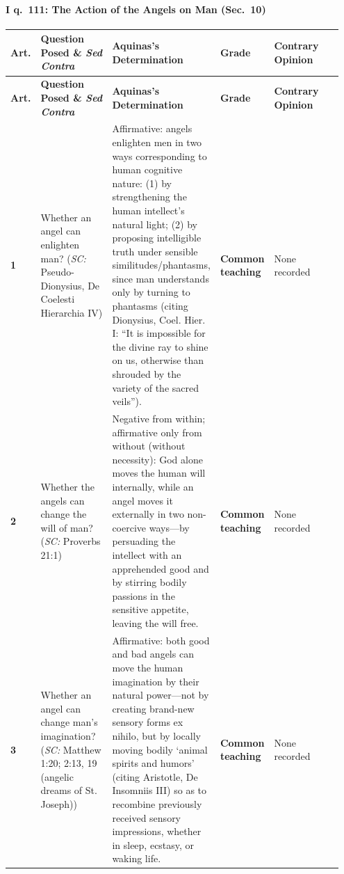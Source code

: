 \paragraph{I q.~111: The Action of the Angels on Man (Sec.~10)}
{\scriptsize
\setlength{\tabcolsep}{2.5pt}
\renewcommand{\arraystretch}{1.15}
\begin{longtable}{>{\raggedright\arraybackslash}p{0.05\linewidth}>{\raggedright\arraybackslash}p{0.23\linewidth}>{\raggedright\arraybackslash}p{0.31\linewidth}>{\raggedright\arraybackslash}p{0.12\linewidth}>{\raggedright\arraybackslash}p{0.24\linewidth}}
\toprule
\textbf{Art.} & \textbf{Question Posed \& \emph{Sed Contra}} & \textbf{Aquinas's Determination} & \textbf{Grade} & \textbf{Contrary Opinion} \\
\midrule
\endfirsthead
\toprule
\textbf{Art.} & \textbf{Question Posed \& \emph{Sed Contra}} & \textbf{Aquinas's Determination} & \textbf{Grade} & \textbf{Contrary Opinion} \\
\midrule
\endhead
\bottomrule
\endfoot
\textbf{1} & Whether an angel can enlighten man? (\emph{SC:} Pseudo-Dionysius, De Coelesti Hierarchia IV) & Affirmative: angels enlighten men in two ways corresponding to human cognitive nature: (1) by strengthening the human intellect's natural light; (2) by proposing intelligible truth under sensible similitudes/phantasms, since man understands only by turning to phantasms (citing Dionysius, Coel. Hier. I: ``It is impossible for the divine ray to shine on us, otherwise than shrouded by the variety of the sacred veils''). & \textbf{Common teaching} & None recorded \\
\addlinespace[1.5pt]
\textbf{2} & Whether the angels can change the will of man? (\emph{SC:} Proverbs 21:1) & Negative from within; affirmative only from without (without necessity): God alone moves the human will internally, while an angel moves it externally in two non-coercive ways---by persuading the intellect with an apprehended good and by stirring bodily passions in the sensitive appetite, leaving the will free. & \textbf{Common teaching} & None recorded \\
\addlinespace[1.5pt]
\textbf{3} & Whether an angel can change man's imagination? (\emph{SC:} Matthew 1:20; 2:13, 19 (angelic dreams of St. Joseph)) & Affirmative: both good and bad angels can move the human imagination by their natural power---not by creating brand-new sensory forms ex nihilo, but by locally moving bodily `animal spirits and humors' (citing Aristotle, De Insomniis III) so as to recombine previously received sensory impressions, whether in sleep, ecstasy, or waking life. & \textbf{Common teaching} & None recorded \\

\end{longtable}}

